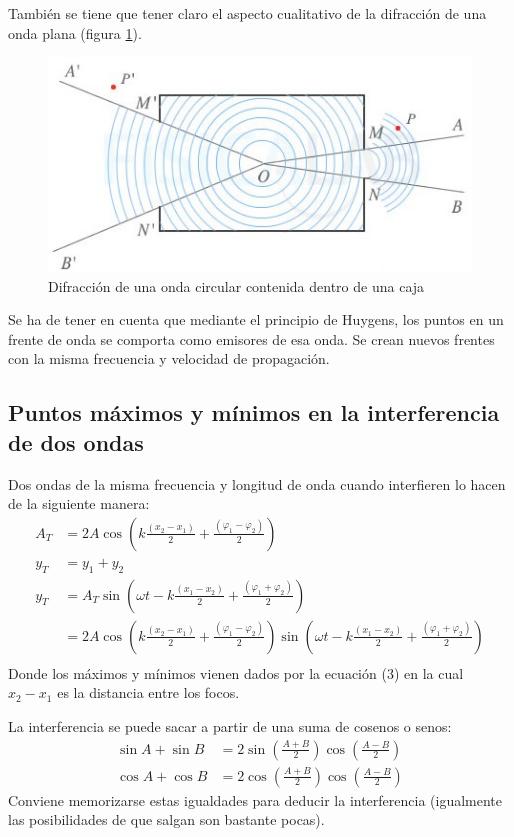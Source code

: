 \documentclass[arial,a4paper,print]{article}
\begin{document}
También se tiene que tener claro el aspecto cualitativo de la difracción de una onda plana (figura \ref{fig:difraccion-ondas}). 
\begin{figure}[h]
	\centering
	\includegraphics[width=0.5\linewidth]{figures/difraccion-ondas}
	\caption{Difracción de una onda circular contenida dentro de una caja}
	\label{fig:difraccion-ondas}
\end{figure}

Se ha de tener en cuenta que mediante el principio de Huygens, los puntos en un frente de onda se comporta como emisores de esa onda. Se crean nuevos frentes con la misma frecuencia y velocidad de propagación. 


\subsection{Puntos máximos y mínimos en la interferencia de dos ondas}
Dos ondas de la misma frecuencia y longitud de onda cuando interfieren lo hacen de la siguiente manera:
\begin{align}
	A_{T} &= 2A\cos\left(k\frac{(x_{2}- x_{1})}{2} + \frac{(\varphi_1-\varphi_{2})}{2}\right) \\
	y_{T} &= y_1 + y_{2} \\
	y_{T} &= A_{T}\sin\left(\omega t - k\frac{(x_{1}-x_{2})}{2} + \frac{(\varphi_1+\varphi_2)}{2}\right) \\
	&= 2A\cos\left(k\frac{(x_{2}- x_{1})}{2} + \frac{(\varphi_1-\varphi_{2})}{2}\right)\sin\left(\omega t - k\frac{(x_{1}-x_{2})}{2} + \frac{(\varphi_1+\varphi_2)}{2}\right)\\
\end{align}
Donde los máximos y mínimos vienen dados por la ecuación (3) en la cual $x_{2} - x_{1}$ es la distancia entre los focos.

La interferencia se puede sacar a partir de una suma de cosenos o senos:
\begin{align*}
	\sin A + \sin B &= 2\sin\left(\frac{A+B}{2}\right)\cos\left(\frac{A-B}{2}\right) \\
	\cos A + \cos B &= 2\cos\left(\frac{A+B}{2}\right)\cos\left(\frac{A-B}{2}\right)
\end{align*}
Conviene memorizarse estas igualdades para deducir la interferencia (igualmente las posibilidades de que salgan son bastante pocas). 
\end{document}
